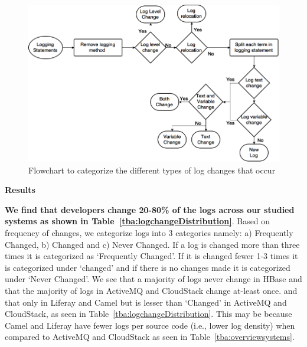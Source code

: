 \begin{figure}[tb]
	\centering
	\includegraphics[width=0.75\linewidth]{Flowchart2v2}
	\caption{Flowchart to categorize the different types of log changes that occur}
	\label{fig:Flowchart2}
\end{figure}


\noindent \textbf{Results}

\textbf{We find that developers change 20-80\% of the logs across our studied systems as shown in Table~\ref{tba:logchangeDistribution}}. Based on frequency of changes, we categorize logs into 3 categories namely: a) Frequently Changed, b) Changed and c) Never Changed. If a log is changed more than three times it is categorized as `Frequently Changed'. If it is changed fewer 1-3 times it is categorized under `changed' and if there is no changes made it is categorized under `Never Changed'. We see that a majority of logs never change in HBase and that the majority of logs in ActiveMQ and CloudStack change at-least once. and that only in Liferay and Camel but is lesser than `Changed' in ActiveMQ and CloudStack, as seen in Table~\ref{tba:logchangeDistribution}. This may be because Camel and Liferay have fewer logs per source code (i.e., lower log density) when compared to ActiveMQ and CloudStack as seen in Table~\ref{tba:overviewsystems}.



